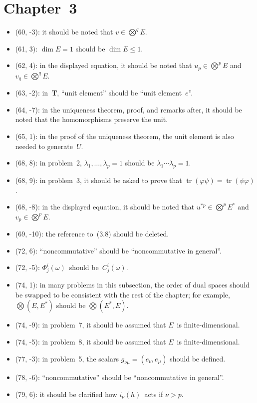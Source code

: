 \documentclass[letterpaper,12pt]{article}
\DeclareMathOperator{\tr}{tr}
\newcommand{\bigtprod}{\bigotimes}
\newcommand{\iprod}[2]{(#1,#2)}
\begin{document}
\section*{Chapter~3}
\begin{itemize}
\item (60, -3): it should be noted that \(v\in\bigtprod^q E\).
\item (61, 3): \(\dim E=1\) should be \(\dim E\le 1\).
\item (62, 4): in the displayed equation, it should be noted that \(u_p\in\bigtprod^p E\) and \(v_q\in\bigtprod^q E\).
\item (63, -2): in~\textbf{T}, ``unit element'' should be ``unit element~\(e\)''.
\item (64, -7): in the uniqueness theorem, proof, and remarks after, it should be noted that the homomorphisms preserve the unit.
\item (65, 1): in the proof of the uniqueness theorem, the unit element is also needed to generate~\(U\).
\item (68, 8): in problem~2, \(\lambda_1,\ldots,\lambda_p=1\) should be \(\lambda_1\cdots\lambda_p=1\).
\item (68, 9): in problem~3, it should be asked to prove that \(\tr(\varphi\psi)=\tr(\psi\varphi)\).
\item (68, -8): in the displayed equation, it should be noted that \(u^{*p}\in\bigtprod^p E^*\) and \(v_p\in\bigtprod^p E\).
\item (69, -10): the reference to~(3.8) should be deleted.
\item (72, 6): ``noncommutative'' should be ``noncommutative in general''.
\item (72, -5): \(\Phi^i_j(\omega)\)~should be~\(C^i_j(\omega)\).
\item (74, 1): in many problems in this subsection, the order of dual spaces should be swapped to be consistent with the rest of the chapter; for example, \(\bigtprod(E,E^*)\) should be \(\bigtprod(E^*,E)\).
\item (74, -9): in problem~7, it should be assumed that \(E\)~is finite-dimensional.
\item (74, -5): in problem~8, it should be assumed that \(E\)~is finite-dimensional.
\item (77, -3): in problem~5, the scalars \(g_{\nu\mu}=\iprod{e_{\nu}}{e_{\mu}}\) should be defined.
\item (78, -6): ``noncommutative'' should be ``noncommutative in general''.
\item (79, 6): it should be clarified how \(i_{\nu}(h)\)~acts if \(\nu>p\).

\end{itemize}
\end{document}
